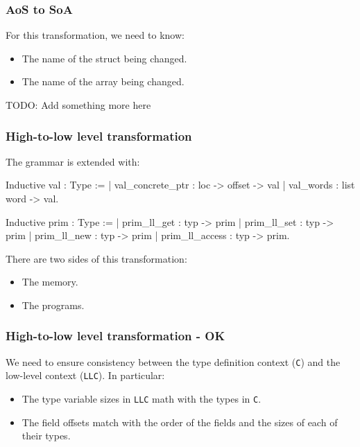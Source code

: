 \begin{frame}[fragile]
\frametitle{AoS to SoA}

For this transformation, we need to know:
\begin{itemize}
	\item The name of the struct being changed.
	\item The name of the array being changed.
\end{itemize}

\bigskip

TODO: Add something more here

\end{frame}


\begin{frame}[fragile]
\frametitle{High-to-low level transformation}

The grammar is extended with:

\begin{coqs}
  Inductive val : Type :=
    | val_concrete_ptr : loc -> offset -> val
    | val_words : list word -> val.
  
  Inductive prim : Type :=
    | prim_ll_get : typ -> prim
    | prim_ll_set : typ -> prim
    | prim_ll_new : typ -> prim
    | prim_ll_access : typ -> prim.
\end{coqs}

\bigskip

There are two sides of this transformation:
\begin{itemize}
	\item The memory.
	\item The programs.
\end{itemize}

\end{frame}


\begin{frame}[fragile]
\frametitle{High-to-low level transformation - OK}

We need to ensure consistency between the type definition context (\texttt{C}) and the low-level context (\texttt{LLC}). In particular:

\begin{itemize}
	\item The type variable sizes in \texttt{LLC} math with the types in \texttt{C}.
	\item The field offsets match with the order of the fields and the sizes of each of their types.
\end{itemize}

\end{frame}


